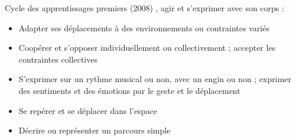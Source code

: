 \documentclass[10pt,french,twocolumn,landscape,a4paper]{article}
\begin{document}
Cycle des apprentissages premiers (2008)%
, agir et s’exprimer avec son corps :
	\begin{itemize}
	\item Adapter ses déplacements à des environnements ou contraintes variés
	\item Coopérer et s’opposer individuellement ou collectivement ; accepter les contraintes collectives
	\item S’exprimer sur un rythme musical ou non, avec un engin ou non ; exprimer des sentiments et des émotions par le geste et le déplacement
	\item Se repérer et se déplacer dans l’espace
	\item Décrire ou représenter un parcours simple
	\end{itemize}
\end{document}
